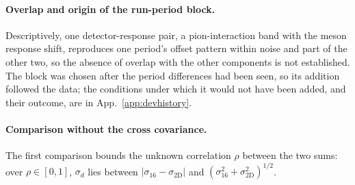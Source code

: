 
\paragraph{Overlap and origin of the run-period block.} Descriptively, one detector-response pair, a pion-interaction band with the meson response shift, reproduces one period's offset pattern within noise and part of the other two, so the absence of overlap with the other components is not established. The block was chosen after the period differences had been seen, so its addition followed the data; the conditions under which it would not have been added, and their outcome, are in App.~\ref{app:devhistory}.

\paragraph{Comparison without the cross covariance.} The first comparison bounds the unknown correlation $\rho$ between the two sums: over $\rho\in[0,1]$, $\sigma_d$ lies between $|\sigma_{16}-\sigma_{\mathrm{2D}}|$ and $(\sigma_{16}^2+\sigma_{\mathrm{2D}}^2)^{1/2}$.

